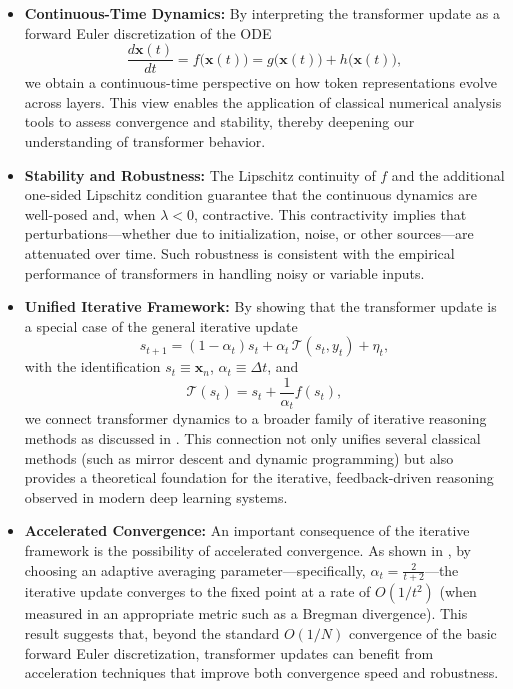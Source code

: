 \begin{itemize}[leftmargin=2em]
    \item \textbf{Continuous-Time Dynamics:} By interpreting the transformer update as a forward Euler discretization of the ODE
    \[
    \frac{d\mathbf{x}(t)}{dt} = f\bigl(\mathbf{x}(t)\bigr) = g\bigl(\mathbf{x}(t)\bigr) + h\bigl(\mathbf{x}(t)\bigr),
    \]
    we obtain a continuous-time perspective on how token representations evolve across layers. This view enables the application of classical numerical analysis tools to assess convergence and stability, thereby deepening our understanding of transformer behavior.

    \item \textbf{Stability and Robustness:} The Lipschitz continuity of \(f\) and the additional one-sided Lipschitz condition guarantee that the continuous dynamics are well-posed and, when \(\lambda < 0\), contractive. This contractivity implies that perturbations—whether due to initialization, noise, or other sources—are attenuated over time. Such robustness is consistent with the empirical performance of transformers in handling noisy or variable inputs.

    \item \textbf{Unified Iterative Framework:} By showing that the transformer update is a special case of the general iterative update
    \[
    s_{t+1} = (1-\alpha_t) s_t + \alpha_t\, \mathcal{T}(s_t, y_t) + \eta_t,
    \]
    with the identification \(s_t \equiv \mathbf{x}_n\), \(\alpha_t \equiv \Delta t\), and
    \[
    \mathcal{T}(s_t) = s_t + \frac{1}{\alpha_t}f(s_t),
    \]
    we connect transformer dynamics to a broader family of iterative reasoning methods as discussed in \cite{feinashley2025iterate}. This connection not only unifies several classical methods (such as mirror descent and dynamic programming) but also provides a theoretical foundation for the iterative, feedback-driven reasoning observed in modern deep learning systems.

    \item \textbf{Accelerated Convergence:} An important consequence of the iterative framework is the possibility of accelerated convergence. As shown in \cite{feinashley2025iterate}, by choosing an adaptive averaging parameter—specifically, \(\alpha_t = \frac{2}{t+2}\)—the iterative update converges to the fixed point at a rate of \(O(1/t^2)\) (when measured in an appropriate metric such as a Bregman divergence). This result suggests that, beyond the standard \(O(1/N)\) convergence of the basic forward Euler discretization, transformer updates can benefit from acceleration techniques that improve both convergence speed and robustness.


\end{itemize}
